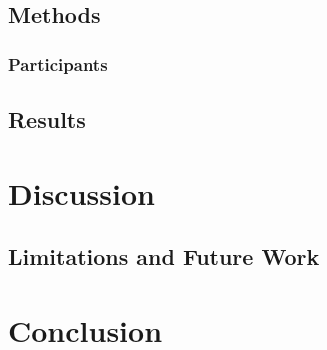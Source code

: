 \documentclass{vgtc}                          %
\begin{document}

\subsection{Methods}


\subsubsection{Participants}
\subsection{Results}

\section{Discussion}
\subsection{Limitations and Future Work}

\section{Conclusion}



%

%
%
%


\end{document}
